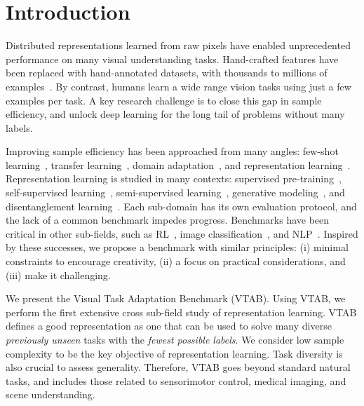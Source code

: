 \documentclass{article}
\begin{document}
\section{Introduction}

Distributed representations learned from raw pixels have enabled unprecedented performance on many visual understanding tasks.
Hand-crafted features have been replaced with hand-annotated datasets, with thousands to millions of examples~\citep{cifar10,imagenet}.
By contrast, humans learn a wide range vision tasks using just a few examples per task.
A key research challenge is to close this gap in sample efficiency, and unlock deep learning for the long tail of problems without many labels.

Improving sample efficiency has been approached from many angles:
few-shot learning~\citep{li2006},
transfer learning~\citep{pan2009survey},
domain adaptation~\citep{wang2018deep},
and representation learning~\citep{bengio2013representation}.
Representation learning is studied in many contexts:
supervised pre-training~\citep{razavian2014},
self-supervised learning~\citep{doersch2015unsupervised},
semi-supervised learning~\citep{chapelle2009semi},
generative modeling~\citep{donahue2016adversarial},
and disentanglement learning~\citep{higgins2017beta}.
Each sub-domain has its own evaluation protocol, and the lack of a common benchmark impedes progress.
Benchmarks have been critical in other sub-fields, such as RL~\citep{atari}, image classification~\citep{imagenet}, and NLP~\citep{glue}.
Inspired by these successes, we propose a benchmark with similar principles:
(i) minimal constraints to encourage creativity,
(ii) a focus on practical considerations, and
(iii) make it challenging.

We present the Visual Task Adaptation Benchmark (VTAB).
Using VTAB, we perform the first extensive cross sub-field study of representation learning.
VTAB defines a good representation as one that can be used to solve many diverse \emph{previously unseen} tasks with the \emph{fewest possible labels}.
We consider low sample complexity to be the key objective of representation learning.
Task diversity is also crucial to assess generality.
Therefore, VTAB goes beyond standard natural tasks, and includes those related to sensorimotor control, medical imaging, and scene understanding.
\end{document}
